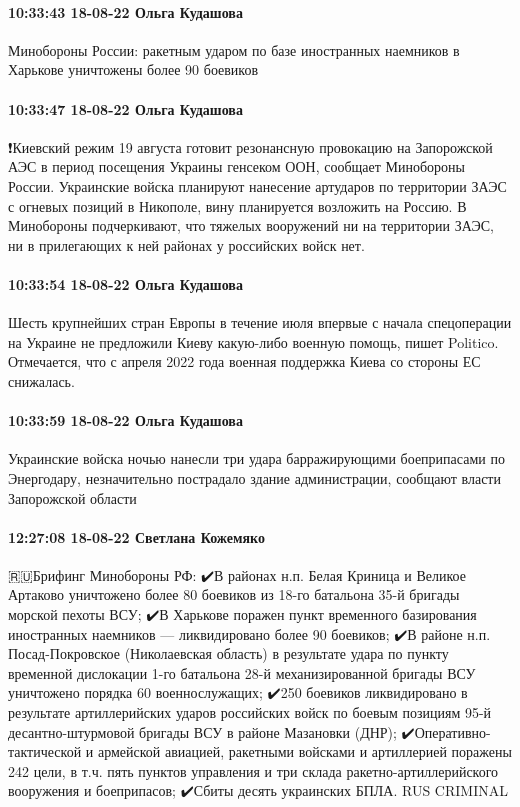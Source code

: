 \paragraph{10:33:43 18-08-22 Ольга Кудашова}

Минобороны России: ракетным ударом по базе иностранных наемников в Харькове уничтожены более 90 боевиков

\paragraph{10:33:47 18-08-22 Ольга Кудашова}

❗️Киевский режим 19 августа готовит резонансную провокацию на Запорожской АЭС в период посещения Украины генсеком ООН, сообщает Минобороны России.
Украинские войска планируют нанесение артударов по территории ЗАЭС с огневых позиций в Никополе, вину планируется возложить на Россию.
В Минобороны подчеркивают, что тяжелых вооружений ни на территории ЗАЭС, ни в прилегающих к ней районах у российских войск нет.

\paragraph{10:33:54 18-08-22 Ольга Кудашова}

Шесть крупнейших стран Европы в течение июля впервые с начала спецоперации на Украине не предложили Киеву какую-либо военную помощь, пишет Politico. Отмечается, что с апреля 2022 года военная поддержка Киева со стороны ЕС снижалась.

\paragraph{10:33:59 18-08-22 Ольга Кудашова}

Украинские войска ночью нанесли три удара барражирующими боеприпасами по
Энергодару, незначительно пострадало здание администрации, сообщают власти
Запорожской области

\paragraph{12:27:08 18-08-22 Светлана Кожемяко}

\obeycr
🇷🇺Брифинг Минобороны РФ:
✔️В районах н.п. Белая Криница и Великое Артаково уничтожено более 80 боевиков из 18-го батальона 35-й бригады морской пехоты ВСУ;
✔️В Харькове поражен пункт временного базирования иностранных наемников — ликвидировано более 90 боевиков;
✔️В районе н.п. Посад-Покровское (Николаевская область) в результате удара по пункту временной дислокации 1-го батальона 28-й механизированной бригады ВСУ уничтожено порядка 60 военнослужащих;
✔️250 боевиков ликвидировано в результате артиллерийских ударов российских войск по боевым позициям 95-й десантно-штурмовой бригады ВСУ в районе Мазановки (ДНР);
✔️Оперативно-тактической и армейской авиацией, ракетными войсками и артиллерией поражены 242 цели, в т.ч. пять пунктов управления и три склада ракетно-артиллерийского вооружения и боеприпасов;
✔️Сбиты десять украинских БПЛА.
RUS CRIMINAL
\restorecr

